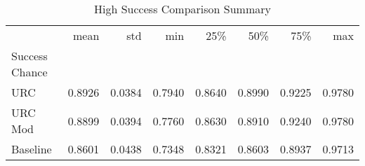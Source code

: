 \begin{table}
\caption{High Success Comparison Summary}
\begin{tabular}{lrrrrrrr}
\toprule
 & mean & std & min & 25\% & 50\% & 75\% & max \\
Success Chance &  &  &  &  &  &  &  \\
\midrule
URC & 0.8926 & 0.0384 & 0.7940 & 0.8640 & 0.8990 & 0.9225 & 0.9780 \\
URC Mod & 0.8899 & 0.0394 & 0.7760 & 0.8630 & 0.8910 & 0.9240 & 0.9780 \\
Baseline & 0.8601 & 0.0438 & 0.7348 & 0.8321 & 0.8603 & 0.8937 & 0.9713 \\
\bottomrule
\end{tabular}
\end{table}
